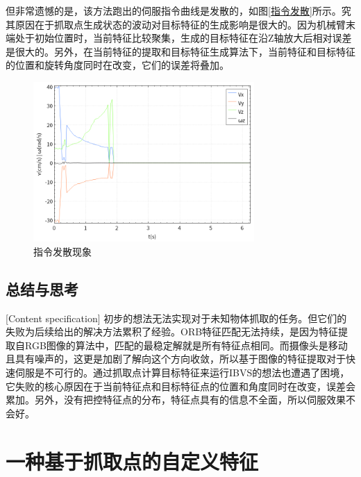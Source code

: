 \documentclass[fontset=fandol,type=bachelor,campus=harbin]{hithesisbook}
\begin{document}
但非常遗憾的是，该方法跑出的伺服指令曲线是发散的，如图\ref{指令发散}所示。究其原因在于抓取点生成状态的波动对目标特征的生成影响是很大的。因为机械臂末端处于初始位置时，当前特征比较聚集，生成的目标特征在沿Z轴放大后相对误差是很大的。另外，在当前特征的提取和目标特征生成算法下，当前特征和目标特征的位置和旋转角度同时在改变，它们的误差将叠加。
\begin{figure}[h]
\centering
\includegraphics[width = 0.75\textwidth]{chapter4/指令发散}
\caption{指令发散现象}
\label{指令发散现象}
\end{figure}


\subsection{总结与思考}[Content specification]
初步的想法无法实现对于未知物体抓取的任务。但它们的失败为后续给出的解决方法累积了经验。ORB特征匹配无法持续，是因为特征提取自RGB图像的算法中，匹配的最稳定解就是所有特征点相同。而摄像头是移动且具有噪声的，这更是加剧了解向这个方向收敛，所以基于图像的特征提取对于快速伺服是不可行的。通过抓取点计算目标特征来运行IBVS的想法也遭遇了困境，它失败的核心原因在于当前特征点和目标特征点的位置和角度同时在改变，误差会累加。另外，没有把控特征点的分布，特征点具有的信息不全面，所以伺服效果不会好。
\section{一种基于抓取点的自定义特征}
\end{document}
